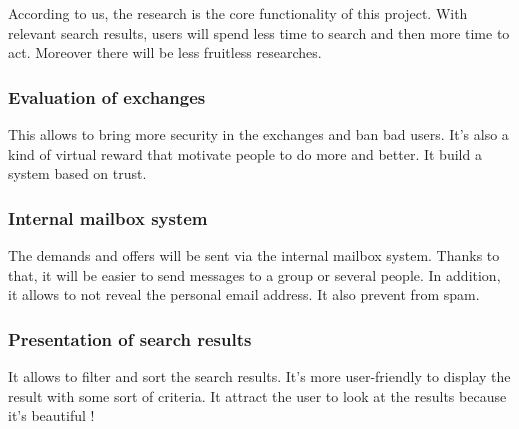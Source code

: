 According to us, the research is the core functionality of this project. With relevant search results, users will spend less time to search and then more time to act. Moreover there will be less fruitless
researches.

\subsubsection{Evaluation of exchanges}

This allows to bring more security in the exchanges and ban bad users. It's also a kind of virtual reward that motivate people to do more and better. It build a system based on trust.

\subsubsection{Internal mailbox system}

The demands and offers will be sent via the internal mailbox system. Thanks to that, it will be easier to send messages to a group or several people. In addition, it allows to not reveal the personal email 
address. It also prevent from spam.

\subsubsection{Presentation of search results}

It allows to filter and sort the search results. It's more user-friendly to display the result with some sort of criteria. It attract the user to look at the results because it's beautiful !